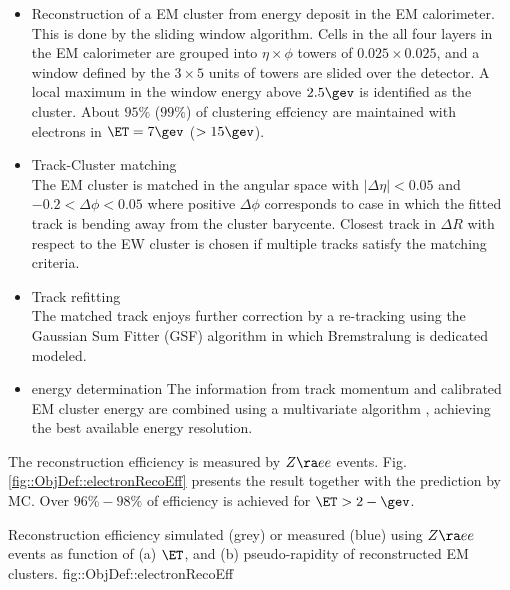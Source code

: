 \begin{itemize}
\item Reconstruction of a EM cluster from energy deposit in the EM calorimeter.
This is done by the sliding window algorithm. Cells in the all four layers in the EM calorimeter are grouped into $\eta\times\phi$ towers of $0.025\times0.025$, and a window defined by the $3\times5$ units of towers are slided over the detector. A local maximum in the window energy above $2.5\gev$ is identified as the cluster. About $95\%$ ($99\%$) of clustering effciency are maintained with electrons in $\ET=7 \gev$ ($>15 \gev$).

\item Track-Cluster matching \\
The EM cluster is matched in the angular space with $|\Delta \eta|<0.05$ and $-0.2<\Delta \phi<0.05$ 
where positive $\Delta \phi$ corresponds to case in which the fitted track is bending away from the cluster barycente.
Closest track in $\Delta R$ with respect to the EW cluster is chosen if multiple tracks satisfy the matching criteria.

\item Track refitting \\
The matched track enjoys further correction by a re-tracking using the Gaussian Sum Fitter (GSF) \cite{158_GSF} algorithm in which Bremstralung is dedicated modeled.

\item energy determination
The information from track momentum and calibrated EM cluster energy are combined using a multivariate algorithm \cite{160_ElecCombMVA}, 
achieving the best available energy resolution.
\end{itemize}

The reconstruction efficiency is measured by $Z\ra ee$ events. Fig. \ref{fig::ObjDef::electronRecoEff} presents the result together with the prediction by MC. Over $96\%-98\%$ of efficiency is achieved for $\ET>2-\gev$.

{ Reconstruction efficiency simulated (grey) or measured (blue) using $Z\ra ee$ events \cite{156_ElectronEffMeas_2015data} as function of (a) $\ET$, and (b) pseudo-rapidity of reconstructed EM clusters.}
{fig::ObjDef::electronRecoEff}


